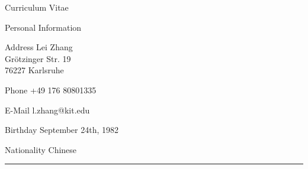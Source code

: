 \cleardoublepage
\pagestyle{empty}


\setlength{\cvlabelwidth}{40mm} 

\sffamily

\begin{cv}{\centerline{\LARGE Curriculum Vitae}}
  \vspace{0.5cm}
  \begin{cvlist}{Personal Information}
  \item[Address] Lei Zhang \\
    Grötzinger Str. 19\\
    76227 Karlsruhe
  \item[Phone] +49 176 80801335
  \item[E-Mail] l.zhang@kit.edu
  \item[Birthday] September 24th, 1982
  \item[Nationality] Chinese
  \end{cvlist}

  \hrule


\end{cv}
